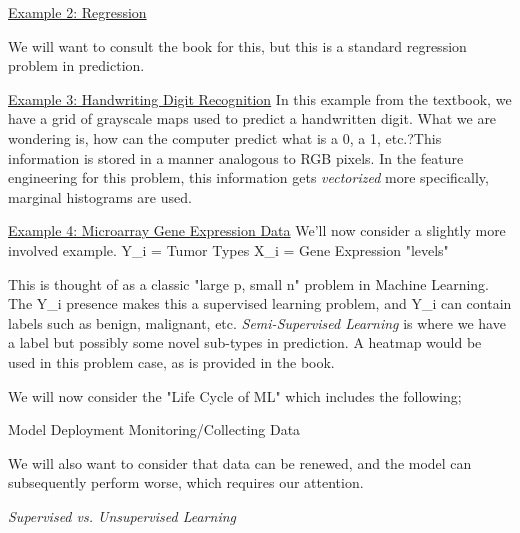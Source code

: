 \documentclass[12pt, letterpaper]{article}
\begin{document}
\underline{Example 2: Regression}

We will want to consult the book for this, but this is a standard regression problem in prediction. 

\underline{Example 3: Handwriting Digit Recognition}
In this example from the textbook, we have a grid of grayscale maps used to predict a handwritten digit. What we are wondering is, how can the computer predict what is a 0, a 1, etc.?This information is stored in a manner analogous to RGB pixels.
In the feature engineering for this problem, this information gets \textit{vectorized} more specifically, marginal histograms are used. 

\underline{Example 4: Microarray Gene Expression Data}
We'll now consider a slightly more involved example. 
Y_i = Tumor Types 
X_i = Gene Expression "levels"

This is thought of as a classic "large p, small n" problem in Machine Learning. 
The Y_i presence makes this a supervised learning problem, and Y_i can contain labels such as benign, malignant, etc. 
\textit{Semi-Supervised Learning} is where we have a label but possibly some novel sub-types in prediction. 
A heatmap would be used in this problem case, as is provided in the book. 

We will now consider the "Life Cycle of ML" which includes the following; 
\begin{enumerate}
		Model Deployment
		Monitoring/Collecting Data 
\end{enumerate}

We will also want to consider that data can be renewed, and the model can subsequently perform worse, which requires our attention. 

\textit{Supervised vs. Unsupervised Learning}
\end{document}

